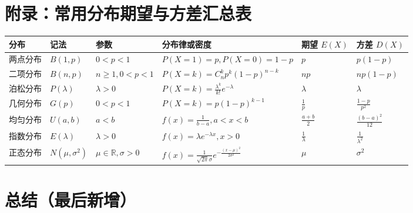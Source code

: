 \documentclass[12pt,a4paper]{ctexart}
\begin{document}
\newpage
\section{附录：常用分布期望与方差汇总表}

\begin{center}
    \begin{tabular}{@{}llllll@{}}
        \toprule
        \textbf{分布} & \textbf{记法}        & \textbf{参数}                      & \textbf{分布律或密度}                                                    & \textbf{期望 $E(X)$}  & \textbf{方差 $D(X)$}    \\ \midrule
        两点分布        & $B(1, p)$          & $0 < p < 1$                      & $P(X=1)=p, P(X=0)=1-p$                                             & $p$                 & $p(1-p)$              \\
        二项分布        & $B(n, p)$          & $n \ge 1, 0 < p < 1$             & $P(X=k)=C_n^k p^k (1-p)^{n-k}$                                     & $np$                & $np(1-p)$             \\
        泊松分布        & $P(\lambda)$       & $\lambda > 0$                    & $P(X=k)=\frac{\lambda^k}{k!}e^{-\lambda}$                          & $\lambda$           & $\lambda$             \\
        几何分布        & $G(p)$             & $0 < p < 1$                      & $P(X=k)=p(1-p)^{k-1}$                                              & $\frac{1}{p}$       & $\frac{1-p}{p^2}$     \\
        均匀分布        & $U(a, b)$          & $a < b$                          & $f(x)=\frac{1}{b-a}, a<x<b$                                        & $\frac{a+b}{2}$     & $\frac{(b-a)^2}{12}$  \\
        指数分布        & $E(\lambda)$       & $\lambda > 0$                    & $f(x)=\lambda e^{-\lambda x}, x>0$                                 & $\frac{1}{\lambda}$ & $\frac{1}{\lambda^2}$ \\
        正态分布        & $N(\mu, \sigma^2)$ & $\mu \in \mathbb{R}, \sigma > 0$ & $f(x)=\frac{1}{\sqrt{2\pi}\sigma}e^{-\frac{(x-\mu)^2}{2\sigma^2}}$ & $\mu$               & $\sigma^2$            \\ \bottomrule
    \end{tabular}
\end{center}

\newpage
\section{总结（最后新增）}
\end{document}
